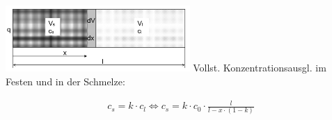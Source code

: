 \includegraphics[width = 70mm]{src/images/Tiegel.png}
Vollst. Konzentrationsausgl. im Festen und in der Schmelze:

\[
\boxed{
    \begin{aligned}
        c_s = k \cdot c_l \Leftrightarrow c_s = k \cdot c_0 \cdot \frac{l}{l - x \cdot(1 - k)}
    \end{aligned}
}
\]